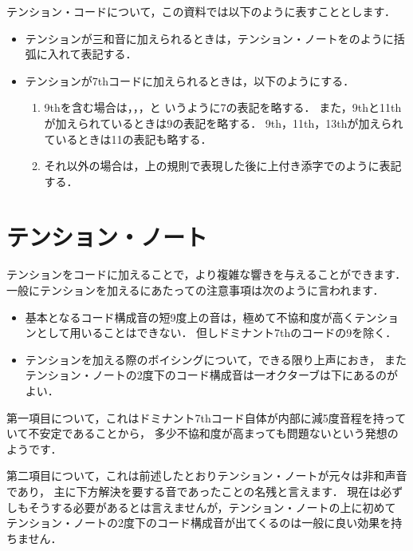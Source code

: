 \documentclass[dvipdfmx,uplatex,b5paper,openany,jbase=12Q,nomag*,textwidth-limit=44%
               ]{gachimuchi}[2020/05/05]
\begin{document}
テンション・コードについて，この資料では以下のように表すこととします．
\begin{itemize}
  \item テンションが三和音に加えられるときは，テンション・ノートを\Gni{}のように括弧に入れて表記する．
  \item テンションが7thコードに加えられるときは，以下のようにする．
  \begin{enumerate}
    \item \bNatural 9thを含む場合は\Gni{}，\Gni\Min{}，\Gni{}，\Gni\Min{}と
    いうように7の表記を略する．
    また，\bNatural 9thと\bNatural 11thが加えられているときは9の表記を略する．
    \bNatural 9th，\bNatural 11th，\bNatural 13thが加えられているときは11の表記も略する．
    \item それ以外の場合は，上の規則で表現した後に上付き添字で\Gni{}のように表記する．
  \end{enumerate}
\end{itemize}

\section{テンション・ノート}
テンションをコードに加えることで，より複雑な響きを与えることができます．
一般にテンションを加えるにあたっての注意事項は次のように言われます．
\begin{itemize}
  \item 基本となるコード構成音の短9度上の音は，極めて不協和度が高くテンションとして用いることはできない．
  但しドミナント7thのコードの\bFlat 9を除く．
  \item テンションを加える際のボイシングについて，できる限り上声におき，
  またテンション・ノートの2度下のコード構成音は一オクターブは下にあるのがよい．
\end{itemize}

第一項目について，これはドミナント7thコード自体が内部に減5度音程を持っていて不安定であることから，
多少不協和度が高まっても問題ないという発想のようです．

第二項目について，これは前述したとおりテンション・ノートが元々は非和声音であり，
主に下方解決を要する音であったことの名残と言えます．
現在は必ずしもそうする必要があるとは言えませんが，テンション・ノートの上に初めて
テンション・ノートの2度下のコード構成音が出てくるのは一般に良い効果を持ちません．
\end{document}
